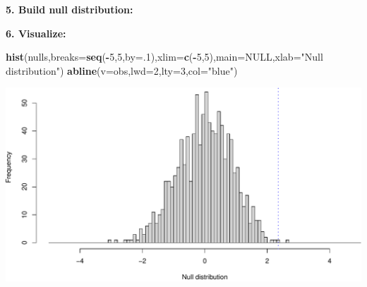 \documentclass[
]{book}
\newenvironment{Shaded}{\begin{snugshade}}{\end{snugshade}}
\newcommand{\ControlFlowTok}[1]{\textcolor[rgb]{0.13,0.29,0.53}{\textbf{#1}}}
\newcommand{\DataTypeTok}[1]{\textcolor[rgb]{0.13,0.29,0.53}{#1}}
\newcommand{\DecValTok}[1]{\textcolor[rgb]{0.00,0.00,0.81}{#1}}
\newcommand{\KeywordTok}[1]{\textcolor[rgb]{0.13,0.29,0.53}{\textbf{#1}}}
\newcommand{\NormalTok}[1]{#1}
\newcommand{\OperatorTok}[1]{\textcolor[rgb]{0.81,0.36,0.00}{\textbf{#1}}}
\newcommand{\OtherTok}[1]{\textcolor[rgb]{0.56,0.35,0.01}{#1}}
\newcommand{\StringTok}[1]{\textcolor[rgb]{0.31,0.60,0.02}{#1}}
\begin{document}
\textbf{5. Build null distribution:}

\begin{Shaded}
\end{Shaded}

\textbf{6. Visualize:}

\begin{Shaded}
\begin{Highlighting}[]
\KeywordTok{hist}\NormalTok{(nulls,}\DataTypeTok{breaks=}\KeywordTok{seq}\NormalTok{(}\OperatorTok{-}\DecValTok{5}\NormalTok{,}\DecValTok{5}\NormalTok{,}\DataTypeTok{by=}\NormalTok{.}\DecValTok{1}\NormalTok{),}\DataTypeTok{xlim=}\KeywordTok{c}\NormalTok{(}\OperatorTok{-}\DecValTok{5}\NormalTok{,}\DecValTok{5}\NormalTok{),}\DataTypeTok{main=}\OtherTok{NULL}\NormalTok{,}\DataTypeTok{xlab=}\StringTok{"Null distribution"}\NormalTok{)}
\KeywordTok{abline}\NormalTok{(}\DataTypeTok{v=}\NormalTok{obs,}\DataTypeTok{lwd=}\DecValTok{2}\NormalTok{,}\DataTypeTok{lty=}\DecValTok{3}\NormalTok{,}\DataTypeTok{col=}\StringTok{"blue"}\NormalTok{)}
\end{Highlighting}
\end{Shaded}

\includegraphics{figures/unnamed-chunk-359-1.pdf}
\end{document}
